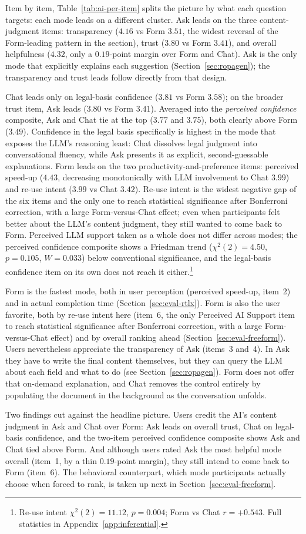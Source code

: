 Item by item, Table~\ref{tab:ai-per-item} splits the picture by
what each question targets: each mode leads on a different
cluster.
Ask leads on the three content-judgment items: transparency
($4.16$ vs Form $3.51$, the widest reversal of the Form-leading
pattern in the section), trust ($3.80$ vs Form $3.41$), and
overall helpfulness ($4.32$, only a $0.19$-point margin over Form
and Chat). Ask is the only mode that explicitly explains each
suggestion (Section~\ref{sec:ropagen}); the transparency and
trust leads follow directly from that design.

Chat leads only on legal-basis confidence ($3.81$ vs Form $3.58$);
on the broader trust item, Ask leads ($3.80$ vs Form $3.41$).
Averaged into the \emph{perceived confidence} composite, Ask and
Chat tie at the top ($3.77$ and $3.75$), both clearly above Form
($3.49$). Confidence in the legal basis specifically is highest
in the mode that exposes the LLM's reasoning least: Chat dissolves
legal judgment into conversational fluency, while Ask presents it
as explicit, second-guessable explanations.
Form leads on the two productivity-and-preference items: perceived
speed-up ($4.43$, decreasing monotonically with LLM involvement to
Chat $3.99$) and re-use intent ($3.99$ vs Chat $3.42$). Re-use
intent is the widest negative gap of the six items and the only
one to reach statistical significance after Bonferroni correction,
with a large Form-versus-Chat effect; even when participants felt
better about the LLM's content judgment, they still wanted to come
back to Form. Perceived LLM support taken as a whole does not
differ across modes; the perceived confidence composite shows
a Friedman trend ($\chi^2(2) = 4.50$, $p = 0.105$, $W = 0.033$)
below conventional significance, and the legal-basis confidence
item on its own does not reach it either.\footnote{Re-use intent
$\chi^2(2) = 11.12$, $p = 0.004$; Form vs Chat $r = +0.543$. Full
statistics in Appendix~\ref{app:inferential}.}

Form is the fastest mode, both in user perception (perceived
speed-up, item~2) and in actual completion time
(Section~\ref{sec:eval-rtlx}). Form is also the user favorite,
both by re-use intent here (item~6, the only Perceived AI Support
item to reach statistical significance after Bonferroni correction,
with a large Form-versus-Chat effect) and by overall ranking ahead
(Section~\ref{sec:eval-freeform}).
Users nevertheless appreciate the transparency of Ask (items~3
and~4). In Ask they have to write the final content themselves,
but they can query the LLM about each field and what to do (see Section~\ref{sec:ropagen}).
Form does not offer that on-demand explanation, and Chat removes the
control entirely by populating the document in the background as
the conversation unfolds.

Two findings cut against the headline picture. Users credit the
AI's content judgment in Ask and Chat over Form: Ask leads on
overall trust, Chat on legal-basis confidence, and the two-item
perceived confidence composite shows Ask and Chat tied above
Form. And although users rated Ask the most helpful mode overall
(item~1, by a thin $0.19$-point margin), they still intend to
come back to Form (item~6).
The behavioral counterpart, which mode participants actually
choose when forced to rank, is taken up next in
Section~\ref{sec:eval-freeform}.

